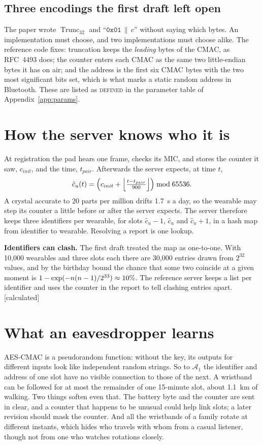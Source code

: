 \documentclass[11pt,a4paper,twoside,openany]{book}
\newcommand{\lbl}[1]{\textsf{\footnotesize\color{rsmuted}[#1]}}
\begin{document}
\subsection*{Three encodings the first draft left open}
The paper wrote $\operatorname{Trunc}_{32}$ and ``$\texttt{0x01}\,\|\,c$'' without saying which bytes. An
implementation must choose, and two implementations must choose alike. The reference code fixes: truncation keeps the
\emph{leading} bytes of the CMAC, as RFC~4493 does; the counter enters each CMAC as the same two little-endian bytes it
has on air; and the address is the first six CMAC bytes with the two most significant bits set, which is what marks a
static random address in Bluetooth. These are listed as \textsc{defined} in the parameter table of
Appendix~\ref{app:params}.

\section{How the server knows who it is}
At registration the pad hears one frame, checks its MIC, and stores the counter it saw, $c_{init}$, and the time,
$t_{pair}$. Afterwards the server expects, at time $t$,
\begin{equation}\hat c_u(t)=\Bigl(c_{init}+\Bigl\lfloor\tfrac{t-t_{pair}}{900}\Bigr\rfloor\Bigr)\bmod65536.\end{equation}
A crystal accurate to 20 parts per million drifts 1.7~s a day, so the wearable may step its counter a little before or
after the server expects. The server therefore keeps three identifiers per wearable, for slots $\hat c_u-1$, $\hat c_u$
and $\hat c_u+1$, in a hash map from identifier to wearable. Resolving a report is one lookup.

\begin{finding}\textbf{Identifiers can clash.} The first draft treated the map as one-to-one. With 10,000 wearables and
three slots each there are 30,000 entries drawn from $2^{32}$ values, and by the birthday bound the chance that some
two coincide at a given moment is $1-\exp(-n(n-1)/2^{33})\approx10\%$. The reference server keeps a list per
identifier and uses the counter in the report to tell clashing entries apart. \lbl{calculated}\end{finding}

\section{What an eavesdropper learns}
AES-CMAC is a pseudorandom function: without the key, its outputs for different inputs look like independent random
strings. So to $\mathcal A_1$ the identifier and address of one slot have no visible connection to those of the next. A
wristband can be followed for at most the remainder of one 15-minute slot, about 1.1~km of walking. Two things soften
even that. The battery byte and the counter are sent in clear, and a counter that happens to be unusual could help
link slots; a later revision should mask the counter. And all the wristbands of a family rotate at different instants,
which hides who travels with whom from a casual listener, though not from one who watches rotations closely.
\end{document}
